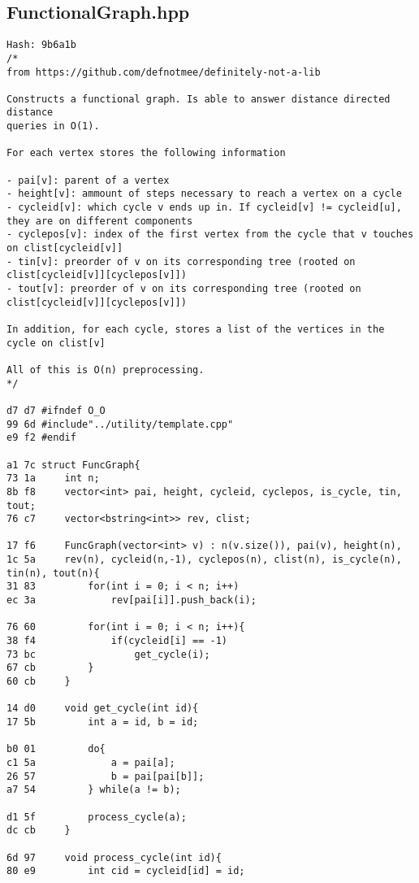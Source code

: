 \documentclass[11pt, a4paper, twoside]{article}
\begin{document}
\subsection{FunctionalGraph.hpp}
\begin{lstlisting}
Hash: 9b6a1b
/*
from https://github.com/defnotmee/definitely-not-a-lib

Constructs a functional graph. Is able to answer distance directed distance
queries in O(1).

For each vertex stores the following information

- pai[v]: parent of a vertex
- height[v]: ammount of steps necessary to reach a vertex on a cycle
- cycleid[v]: which cycle v ends up in. If cycleid[v] != cycleid[u], they are on different components
- cyclepos[v]: index of the first vertex from the cycle that v touches on clist[cycleid[v]]
- tin[v]: preorder of v on its corresponding tree (rooted on clist[cycleid[v]][cyclepos[v]])
- tout[v]: preorder of v on its corresponding tree (rooted on clist[cycleid[v]][cyclepos[v]])

In addition, for each cycle, stores a list of the vertices in the cycle on clist[v]

All of this is O(n) preprocessing.
*/

d7 d7 #ifndef O_O
99 6d #include"../utility/template.cpp"
e9 f2 #endif

a1 7c struct FuncGraph{
73 1a     int n;
8b f8     vector<int> pai, height, cycleid, cyclepos, is_cycle, tin, tout;
76 c7     vector<bstring<int>> rev, clist;
      
17 f6     FuncGraph(vector<int> v) : n(v.size()), pai(v), height(n), 
1c 5a     rev(n), cycleid(n,-1), cyclepos(n), clist(n), is_cycle(n), tin(n), tout(n){
31 83         for(int i = 0; i < n; i++)  
ec 3a             rev[pai[i]].push_back(i);
      
76 60         for(int i = 0; i < n; i++){
38 f4             if(cycleid[i] == -1)
73 bc                 get_cycle(i);
67 cb         }
60 cb     }
      
14 d0     void get_cycle(int id){
17 5b         int a = id, b = id;
      
b0 01         do{
c1 5a             a = pai[a];
26 57             b = pai[pai[b]];
a7 54         } while(a != b);
      
d1 5f         process_cycle(a);
dc cb     }
      
6d 97     void process_cycle(int id){
80 e9         int cid = cycleid[id] = id;
      

\end{lstlisting}
\end{document}
